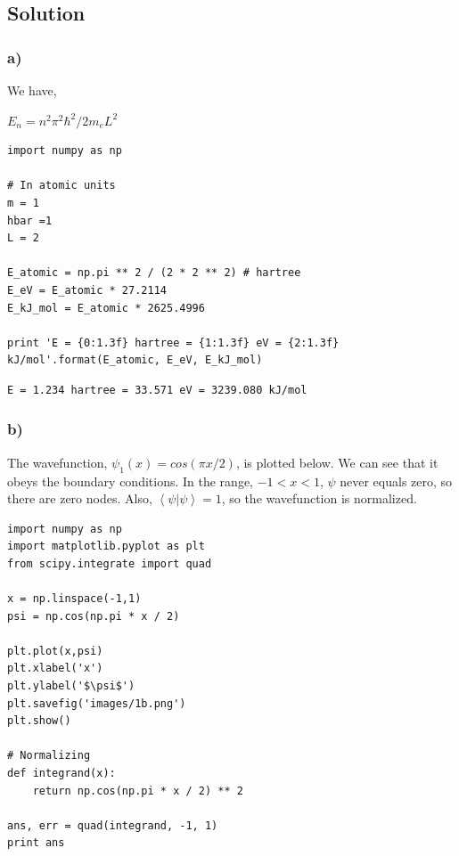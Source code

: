 \documentclass[11pt]{article}
\begin{document}
\subsection{Solution}
\label{sec-1-1}

\subsubsection{a)}
\label{sec-1-1-1}

We have,

$E_{n} = n^{2} \pi^{2} \hbar^{2} / 2 m_{e} L^{2}$

\begin{verbatim}
import numpy as np

# In atomic units
m = 1
hbar =1
L = 2

E_atomic = np.pi ** 2 / (2 * 2 ** 2) # hartree
E_eV = E_atomic * 27.2114
E_kJ_mol = E_atomic * 2625.4996

print 'E = {0:1.3f} hartree = {1:1.3f} eV = {2:1.3f} kJ/mol'.format(E_atomic, E_eV, E_kJ_mol)
\end{verbatim}

\begin{verbatim}
E = 1.234 hartree = 33.571 eV = 3239.080 kJ/mol
\end{verbatim}


\subsubsection{b)}
\label{sec-1-1-2}
The wavefunction, $\psi_{1}(x) = cos (\pi x/2)$, is plotted below. We can see that it obeys the boundary conditions. In the range, $-1 < x < 1$, $\psi$ never equals zero, so there are zero nodes. Also, $\left<\psi|\psi\right> = 1$, so the wavefunction is normalized.

\begin{verbatim}
import numpy as np
import matplotlib.pyplot as plt
from scipy.integrate import quad

x = np.linspace(-1,1)
psi = np.cos(np.pi * x / 2)

plt.plot(x,psi)
plt.xlabel('x')
plt.ylabel('$\psi$')
plt.savefig('images/1b.png')
plt.show()

# Normalizing
def integrand(x):
    return np.cos(np.pi * x / 2) ** 2

ans, err = quad(integrand, -1, 1)
print ans
\end{verbatim}
\end{document}
